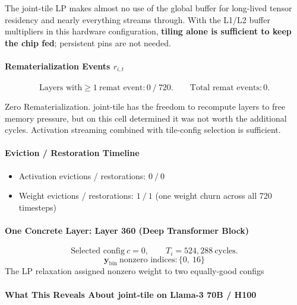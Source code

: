 \noindent The joint-tile LP makes almost no use of the global buffer for
long-lived tensor residency and nearly everything streams through.
With the L1/L2 buffer multipliers in this hardware configuration, \textbf{tiling alone is sufficient to keep the chip fed}; persistent pins are not needed.

\paragraph{Rematerialization Events $r_{i,t}$}

\[ \text{Layers with} \geq 1\ \text{remat event}: 0\ /\ 720. \qquad \text{Total remat events}: 0. \]

\noindent Zero Rematerialization. joint-tile has the freedom to recompute
layers to free memory pressure, but on this cell determined it was not worth the additional cycles.
Activation streaming combined with tile-config selection is sufficient.

\paragraph{Eviction / Restoration Timeline}

\begin{itemize}[leftmargin=1.4em, itemsep=2pt]
    \item Activation evictions / restorations: $0\ /\ 0$
    \item Weight evictions / restorations: $1\ /\ 1$
          (one weight churn across all 720 timesteps)
\end{itemize}

\paragraph{One Concrete Layer: Layer 360 (Deep Transformer Block)}

\[ \text{Selected config}\ c = 0, \qquad T_i = 524{,}288\ \text{cycles}. \]
\[ \mathbf{y}_{\mathrm{bin}}\ \text{nonzero indices}: \{0,\ 16\} \]
The LP relaxation assigned nonzero weight to two equally-good configs

\paragraph{What This Reveals About joint-tile on Llama-3 70B / H100}

